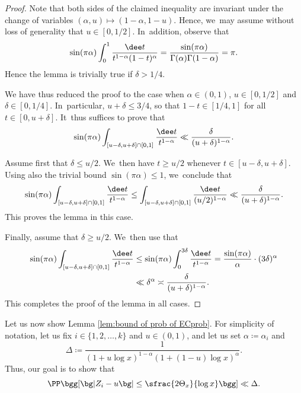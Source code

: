 \begin{proof} Note that both sides of the claimed inequality are invariant under the change of variables $(\alpha,u)\mapsto (1-\alpha,1-u)$. Hence, we~may assume without loss of generality that $u\in[0,1/2]$. In~addition, observe that
\[
\sin(\pi\alpha)\int_0^1 \frac{\dee t}{t^{1-\alpha}(1-t)^\alpha} = \frac{\sin(\pi\alpha)}{\Gamma(\alpha)\Gamma(1-\alpha)} = \pi.
\]
Hence the lemma is trivially true if $\delta > 1/4$.

We have thus reduced the proof to the case when $\alpha\in(0,1)$, $u\in[0,1/2]$ and $\delta\in[0,1/4]$. In~particular, $u+\delta\le 3/4$, so that $1-t\in[1/4,1]$ for all $t\in[0,u+\delta]$. It~thus suffices to prove that
\begin{equation}
\label{eq:beta bound - new goal}
\sin(\pi\alpha) \int_{[u-\delta,u+\delta]\cap[0,1]} \frac{\dee t}{t^{1-\alpha}} \ll \frac{\delta}{(u+\delta)^{1-\alpha}}.
\end{equation}

Assume first that $\delta\le u/2$. We~then have $t\ge u/2$ whenever $t\in[u-\delta,u+\delta]$. Using also the trivial bound $\sin(\pi\alpha)\le1$, we~conclude that
\[
\sin(\pi\alpha) \int_{[u-\delta,u+\delta]\cap[0,1]} \frac{\dee t}{t^{1-\alpha}} \le \int_{[u-\delta,u+\delta]\cap[0,1]} \frac{\dee t}{(u/2)^{1-\alpha}} \ll \frac{\delta}{(u+\delta)^{1-\alpha}}.
\]
This proves the lemma in this case.

Finally, assume that $\delta\ge u/2$. We~then use that
\begin{align*}
\sin(\pi\alpha) \int_{[u-\delta,u+\delta]\cap[0,1]} \frac{\dee t}{t^{1-\alpha}}
&\le \sin(\pi\alpha)\int_0^{3\delta} \frac{\dee t}{t^{1-\alpha}} =\frac{\sin(\pi \alpha)}{\alpha} \cdot (3\delta)^\alpha \\
&\ll \delta^\alpha \asymp \frac{\delta}{(u+\delta)^{1-\alpha}}.
\end{align*}
This completes the proof of the lemma in all cases.
\end{proof}

Let us now show Lemma \ref{lem:bound of prob of ECprob}. For simplicity of notation, let us fix $i\in\{1,2,\dots,k\}$ and $u\in(0,1)$, and let us set $\alpha \coloneqq \alpha_i$ and
\[
\Delta \coloneqq \frac{1}{(1+ u\log x)^{1-\alpha}(1+(1-u)\log x)^{\alpha}}.
\]
Thus, our goal is to show that
\begin{equation}
\label{eq:Bprob rewrite}
\PP\bgg[ \bg| Z_i - u \bg|\le \sfrac{2\Theta_x}{\log x}\bgg] \ll \Delta.
\end{equation}

